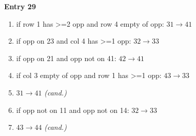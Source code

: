 \small
\noindent\textbf{Entry 29} \; 
\nopagebreak\begin{enumerate}[topsep=1pt,itemsep=0pt,parsep=0pt,leftmargin=2.2em,label=\arabic*.]
\item if row 1 has >=2 opp and row 4 empty of opp: $31\!\to\!41$
\item if opp on 23 and col 4 has >=1 opp: $32\!\to\!33$
\item if opp on 21 and opp not on 41: $42\!\to\!41$
\item if col 3 empty of opp and row 1 has >=1 opp: $43\!\to\!33$
\item $31\!\to\!41$ \hfill\textit{(cand.)}
\item if opp not on 11 and opp not on 14: $32\!\to\!33$
\item $43\!\to\!44$ \hfill\textit{(cand.)}
\end{enumerate}\smallskip